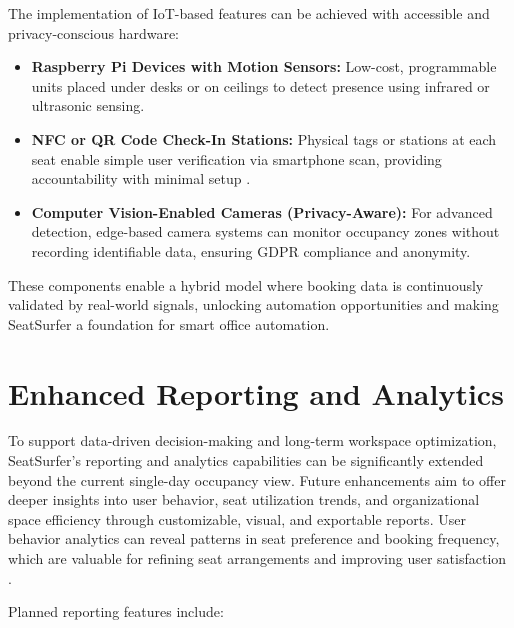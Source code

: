\documentclass[12pt,a4paper]{report} %
\begin{document}
The implementation of IoT-based features can be achieved with accessible and privacy-conscious hardware:

\begin{itemize}
    \item \textbf{Raspberry Pi Devices with Motion Sensors:}  
    Low-cost, programmable units placed under desks or on ceilings to detect presence using infrared or ultrasonic sensing.
    \item \textbf{NFC or QR Code Check-In Stations:}  
    Physical tags or stations at each seat enable simple user verification via smartphone scan, providing accountability with minimal setup \cite{singh2022nfc}.
    \item \textbf{Computer Vision-Enabled Cameras (Privacy-Aware):}  
    For advanced detection, edge-based camera systems can monitor occupancy zones without recording identifiable data, ensuring GDPR compliance and anonymity.
\end{itemize}

These components enable a hybrid model where booking data is continuously validated by real-world signals, unlocking automation opportunities and making SeatSurfer a foundation for smart office automation.

\section{Enhanced Reporting and Analytics}

To support data-driven decision-making and long-term workspace optimization, SeatSurfer's reporting and analytics capabilities can be significantly extended beyond the current single-day occupancy view. Future enhancements aim to offer deeper insights into user behavior, seat utilization trends, and organizational space efficiency through customizable, visual, and exportable reports. User behavior analytics can reveal patterns in seat preference and booking frequency, which are valuable for refining seat arrangements and improving user satisfaction \cite{brown2022usertracking}.

Planned reporting features include:
\end{document}
